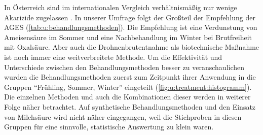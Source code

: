In Österreich sind im internationalen Vergleich verhältnismäßig nur wenige Akarizide zugelassen \citep{brodschneider2019}. In unserer Umfrage folgt der Großteil der Empfehlung der AGES \citep{moosbeckhofer2015} (\cref{tab:u:behandlungsmethoden}). Die Empfehlung ist eine Verdunstung von Ameisensäure im Sommer und eine Nachbehandlung im Winter bei Brutfreiheit mit Oxalsäure. Aber auch die Drohnenbrutentnahme als biotechnische Maßnahme ist noch immer eine weitverbreitete Methode. Um die Effektivität und Unterschiede zwischen den Behandlungsmethoden besser zu veranschaulichen wurden die Behandlungsmethoden zuerst zum Zeitpunkt ihrer Anwendung in die Gruppen \enquote{Frühling, Sommer, Winter} eingeteilt (\cref{fig:u:treatment:histogramm}).
\\
Die einzelnen Methoden und auch die Kombinationen dieser werden in weiterer Folge näher betrachtet. 
Auf synthetische Behandlungsmethoden und den Einsatz von Milchsäure wird nicht näher eingegangen, weil die Stichproben in diesen Gruppen für eine sinnvolle, statistische Auswertung zu klein waren.


